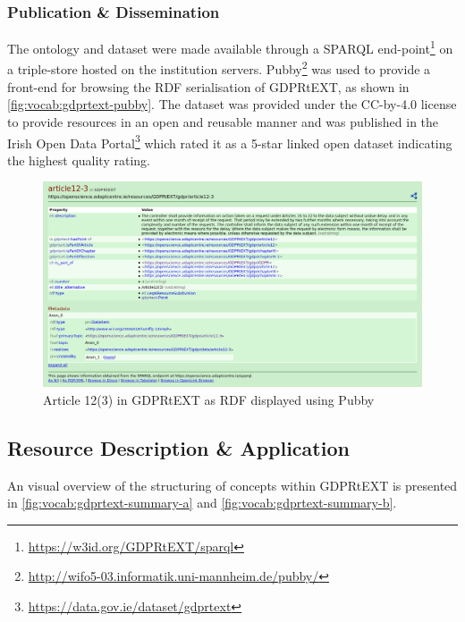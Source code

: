 \subsubsection{Publication \& Dissemination}
The ontology and dataset were made available through a SPARQL end-point\footnote{\url{https://w3id.org/GDPRtEXT/sparql}} on a triple-store hosted on the institution servers. Pubby\footnote{\url{http://wifo5-03.informatik.uni-mannheim.de/pubby/}} was used to provide a front-end for browsing the RDF serialisation of GDPRtEXT, as shown in \autoref{fig:vocab:gdprtext-pubby}. The dataset was provided under the CC-by-4.0 license to provide resources in an open and reusable manner and was published in the Irish Open Data Portal\footnote{\url{https://data.gov.ie/dataset/gdprtext}} which rated it as a 5-star linked open dataset indicating the highest quality rating. \begin{figure}[htbp]
    \centering
    \includegraphics[width=\linewidth]{img/gdprtext-pubby}
    \caption{Article 12(3) in GDPRtEXT as RDF displayed using Pubby \cite{pandit_gdprtext_2018}}
    \label{fig:vocab:gdprtext-pubby}
\end{figure}

\subsection{Resource Description \& Application}
An visual overview of the structuring of concepts within GDPRtEXT is presented in \autoref{fig:vocab:gdprtext-summary-a} and \autoref{fig:vocab:gdprtext-summary-b}.


